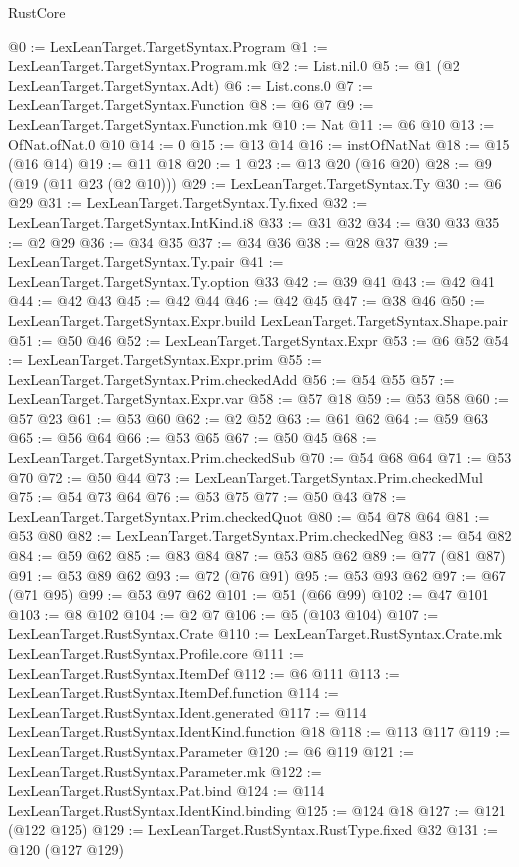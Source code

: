 \begin{lexlean}{RustCore}
\begin{coremodule}
@0 := LexLeanTarget.TargetSyntax.Program
@1 := LexLeanTarget.TargetSyntax.Program.mk
@2 := List.nil.{0}
@5 := @1 (@2 LexLeanTarget.TargetSyntax.Adt)
@6 := List.cons.{0}
@7 := LexLeanTarget.TargetSyntax.Function
@8 := @6 @7
@9 := LexLeanTarget.TargetSyntax.Function.mk
@10 := Nat
@11 := @6 @10
@13 := OfNat.ofNat.{0} @10
@14 := 0
@15 := @13 @14
@16 := instOfNatNat
@18 := @15 (@16 @14)
@19 := @11 @18
@20 := 1
@23 := @13 @20 (@16 @20)
@28 := @9 (@19 (@11 @23 (@2 @10)))
@29 := LexLeanTarget.TargetSyntax.Ty
@30 := @6 @29
@31 := LexLeanTarget.TargetSyntax.Ty.fixed
@32 := LexLeanTarget.TargetSyntax.IntKind.i8
@33 := @31 @32
@34 := @30 @33
@35 := @2 @29
@36 := @34 @35
@37 := @34 @36
@38 := @28 @37
@39 := LexLeanTarget.TargetSyntax.Ty.pair
@41 := LexLeanTarget.TargetSyntax.Ty.option @33
@42 := @39 @41
@43 := @42 @41
@44 := @42 @43
@45 := @42 @44
@46 := @42 @45
@47 := @38 @46
@50 := LexLeanTarget.TargetSyntax.Expr.build LexLeanTarget.TargetSyntax.Shape.pair
@51 := @50 @46
@52 := LexLeanTarget.TargetSyntax.Expr
@53 := @6 @52
@54 := LexLeanTarget.TargetSyntax.Expr.prim
@55 := LexLeanTarget.TargetSyntax.Prim.checkedAdd
@56 := @54 @55
@57 := LexLeanTarget.TargetSyntax.Expr.var
@58 := @57 @18
@59 := @53 @58
@60 := @57 @23
@61 := @53 @60
@62 := @2 @52
@63 := @61 @62
@64 := @59 @63
@65 := @56 @64
@66 := @53 @65
@67 := @50 @45
@68 := LexLeanTarget.TargetSyntax.Prim.checkedSub
@70 := @54 @68 @64
@71 := @53 @70
@72 := @50 @44
@73 := LexLeanTarget.TargetSyntax.Prim.checkedMul
@75 := @54 @73 @64
@76 := @53 @75
@77 := @50 @43
@78 := LexLeanTarget.TargetSyntax.Prim.checkedQuot
@80 := @54 @78 @64
@81 := @53 @80
@82 := LexLeanTarget.TargetSyntax.Prim.checkedNeg
@83 := @54 @82
@84 := @59 @62
@85 := @83 @84
@87 := @53 @85 @62
@89 := @77 (@81 @87)
@91 := @53 @89 @62
@93 := @72 (@76 @91)
@95 := @53 @93 @62
@97 := @67 (@71 @95)
@99 := @53 @97 @62
@101 := @51 (@66 @99)
@102 := @47 @101
@103 := @8 @102
@104 := @2 @7
@106 := @5 (@103 @104)
@107 := LexLeanTarget.RustSyntax.Crate
@110 := LexLeanTarget.RustSyntax.Crate.mk LexLeanTarget.RustSyntax.Profile.core
@111 := LexLeanTarget.RustSyntax.ItemDef
@112 := @6 @111
@113 := LexLeanTarget.RustSyntax.ItemDef.function
@114 := LexLeanTarget.RustSyntax.Ident.generated
@117 := @114 LexLeanTarget.RustSyntax.IdentKind.function @18
@118 := @113 @117
@119 := LexLeanTarget.RustSyntax.Parameter
@120 := @6 @119
@121 := LexLeanTarget.RustSyntax.Parameter.mk
@122 := LexLeanTarget.RustSyntax.Pat.bind
@124 := @114 LexLeanTarget.RustSyntax.IdentKind.binding
@125 := @124 @18
@127 := @121 (@122 @125)
@129 := LexLeanTarget.RustSyntax.RustType.fixed @32
@131 := @120 (@127 @129)

\end{coremodule}
\end{lexlean}
